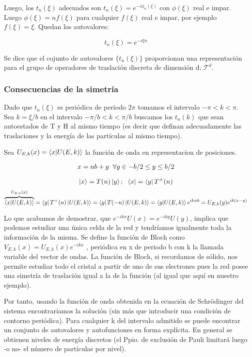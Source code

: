\documentclass{article}
\begin{document}
Luego, los $t_n(\xi)$ adecuados son $ t_n(\xi)=e^{-i\phi _n(\xi)}$ con $\phi (\xi)$ real e impar. Luego $\phi (\xi)=nf(\xi)$ para cualquier $f(\xi)$ real e impar, por ejemplo $f(\xi)=\xi$. Quedan los autovalores:

$$t_n(\xi)=e^{-i\xi n}$$

Se dice que el cojunto de autovalores $\lbrace t_n(\xi) \rbrace$ proporcionan una representación para el grupo de operadores de traslación discreta de dimensión d: $\mathcal{T}^d$.

\subsubsection{Consecuencias de la simetría}
Dado que $t_n(\xi)$ es periódica de periodo $2\pi$  tomamos el intervalo $-\pi <k<\pi$. Sea $k=\xi/b$ en el intervalo $-\pi/b<k<\pi/b$ buscamos los $t_n(k)$ que sean autoestados de T y H al mismo tiempo (es decir que definan adecuadamente las traslaciones y la energía de las partículas al mismo tiempo). 

\smallskip
Sea $U_{E,k}(x)=\braket{x|U(E,k)}$ la función de onda en representacion de posiciones.

$$x=nb+y \hspace{0.2cm} \forall y \in -b/2\leq y \leq b/2$$

$$\ket{x}=T(n)\ket{y}; \hspace{0.2cm}\bra{x}=\bra{y}T^+(n)$$
$$\overbrace{\braket{x|U(E,k)}}^{U_{E,k}(x)}=\bra{y}T^+(n)\ket{U(E,k)}=\bra{y}T(-n)\ket{U(E,k)}=\braket{y|U(E,k)}e^{iknb}=U_{E,k}(y)e^{ik(x-y)}$$

Lo que acabamos de demostrar, que $e^{-ikx}U(x)=e^{-iky}U(y)$, implica que podemos estudiar una única celda de la red y tendríamos igualmente toda la información de la misma. Se define la función de Bloch como $V_{E,k}(x)=U_{E,k}(x)e^{-ikx}$ , periódica en x de periodo b con k la llamada variable del vector de ondas. La función de Bloch, si recordamos de sólido, nos permite estudiar todo el cristal a partir de uno de sus electrones pues la red posee una simetría de traslación igual a la de la función (al igual que aquí en nuestro ejemplo).
\newpage

Por tanto, usando la función de onda obtenida en la ecuación de Schrödinger del sistema encontraríamos la solución (sin más que introducir una condición de contorno periódica). Para cualquier k del intervalo admitido se puede encontrar un conjunto de autovalores y autofunciones en forma explícita. En general se obtienen niveles de energía discretos (el Ppio. de exclusión de Pauli limitará luego -o no- el número de partículas por nivel).
\end{document}
